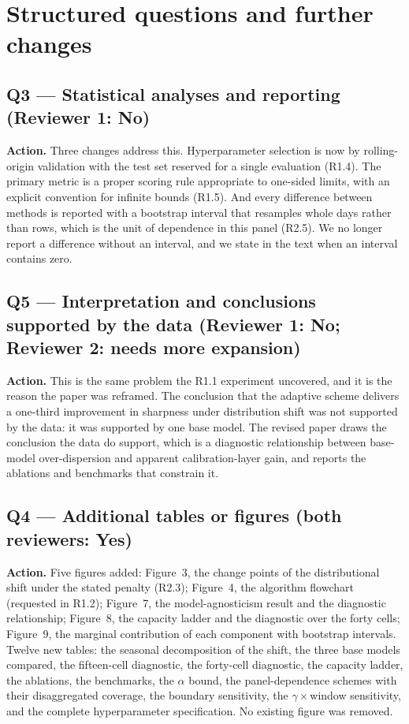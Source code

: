 \documentclass[11pt,a4paper]{article}
\newcommand{\action}[1]{\textbf{Action.} #1}
\begin{document}
\clearpage
\section{Structured questions and further changes}

\subsection*{Q3 --- Statistical analyses and reporting (Reviewer 1: No)}

\action{Three changes address this. Hyperparameter selection is now by rolling-origin validation with the test set reserved for a single evaluation (R1.4). The primary metric is a proper scoring rule appropriate to one-sided limits, with an explicit convention for infinite bounds (R1.5). And every difference between methods is reported with a bootstrap interval that resamples whole days rather than rows, which is the unit of dependence in this panel (R2.5). We no longer report a difference without an interval, and we state in the text when an interval contains zero.}

\subsection*{Q5 --- Interpretation and conclusions supported by the data (Reviewer 1: No; Reviewer 2: needs more expansion)}

\action{This is the same problem the R1.1 experiment uncovered, and it is the reason the paper was reframed. The conclusion that the adaptive scheme delivers a one-third improvement in sharpness under distribution shift was not supported by the data: it was supported by one base model. The revised paper draws the conclusion the data do support, which is a diagnostic relationship between base-model over-dispersion and apparent calibration-layer gain, and reports the ablations and benchmarks that constrain it.}

\subsection*{Q4 --- Additional tables or figures (both reviewers: Yes)}

\action{Five figures added: Figure~3, the change points of the distributional shift under the stated penalty (R2.3); Figure~4, the algorithm flowchart (requested in R1.2); Figure~7, the model-agnosticism result and the diagnostic relationship; Figure~8, the capacity ladder and the diagnostic over the forty cells; Figure~9, the marginal contribution of each component with bootstrap intervals. Twelve new tables: the seasonal decomposition of the shift, the three base models compared, the fifteen-cell diagnostic, the forty-cell diagnostic, the capacity ladder, the ablations, the benchmarks, the $\alpha$ bound, the panel-dependence schemes with their disaggregated coverage, the boundary sensitivity, the $\gamma\times$window sensitivity, and the complete hyperparameter specification. No existing figure was removed.}
\end{document}
